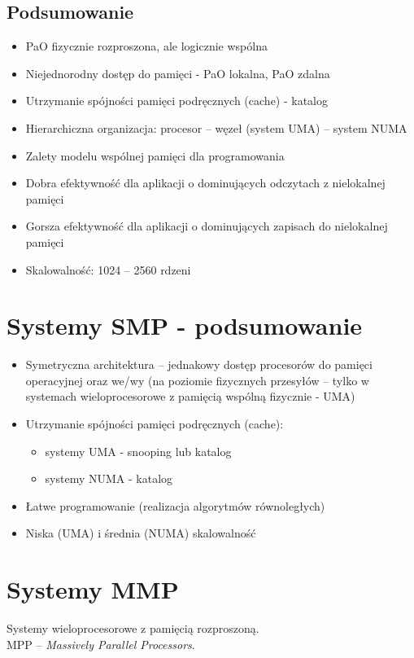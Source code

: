 \documentclass[a4paper,twoside]{article}
\begin{document}
\subsection{Podsumowanie}
\begin{itemize}
	\item PaO fizycznie rozproszona, ale logicznie wspólna
	\item Niejednorodny dostęp do pamięci - PaO lokalna, PaO zdalna
	\item Utrzymanie spójności pamięci podręcznych (cache) - katalog
	\item Hierarchiczna organizacja: procesor – węzeł (system UMA) – system NUMA
	\item Zalety modelu wspólnej pamięci dla programowania
	\item Dobra efektywność dla aplikacji o dominujących odczytach z nielokalnej pamięci
	\item Gorsza efektywność dla aplikacji o dominujących zapisach do nielokalnej pamięci
	\item Skalowalność: 1024 – 2560 rdzeni
\end{itemize}

\section{Systemy SMP - podsumowanie}
\begin{itemize}
	\item Symetryczna architektura – jednakowy dostęp procesorów do pamięci operacyjnej oraz we/wy (na poziomie fizycznych przesyłów –
	tylko w systemach wieloprocesorowe z pamięcią wspólną fizycznie - UMA)
	\item Utrzymanie spójności pamięci podręcznych (cache):
	\begin{itemize}
		\item systemy UMA - snooping lub katalog
		\item systemy NUMA - katalog
	\end{itemize}
	\item Łatwe programowanie (realizacja algorytmów równoległych)
	\item Niska (UMA) i średnia (NUMA) skalowalność
\end{itemize}

\section{Systemy MMP}
Systemy wieloprocesorowe z pamięcią rozproszoną.\\
MPP – \emph{Massively Parallel Processors}.
\end{document}

